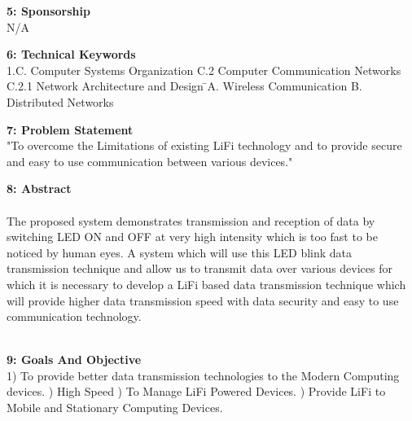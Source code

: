 \documentclass[12pt]{report}	%
\begin{document}
{\large\textbf{5: Sponsorship}\\
{\small N/A}\\


{\large\textbf{6:  Technical Keywords }\\
{\small 1.C. Computer Systems Organization  
        \newline C.2 Computer Communication Networks
        \newline C.2.1 Network Architecture and Design
       \= \newline A. Wireless Communication
        \newline B. Distributed Networks 
        \newline
       }\\
        
        
{\large\textbf{7: Problem Statement}\\
{\small "To overcome the Limitations of existing LiFi technology and to provide secure and easy to use communication between various devices."}
\newline\\


{\large\textbf{8: Abstract }\\
{\small \paragraph{}The proposed system demonstrates transmission and reception of data by switching LED ON and OFF at very high intensity which is too fast to be noticed by human eyes.  A system which will use this LED blink data transmission technique and allow us to transmit data over various devices for which it is necessary to  develop a LiFi based data transmission technique which will provide higher data transmission speed with data security and easy to use communication technology.}\\


{\large\textbf{9: Goals And Objective}\\
{\small          1) To provide better data transmission technologies to the Modern Computing devices.
       {) High Speed}
       {) To Manage LiFi Powered Devices.}
       {) Provide LiFi to Mobile and Stationary Computing Devices.}\\
       
}}}}}}
\end{document}
